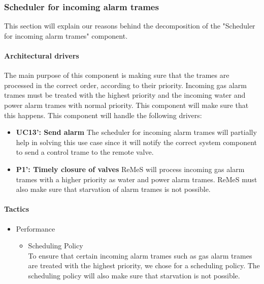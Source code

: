 \subsubsection{Scheduler for incoming alarm trames}
This section will explain our reasons behind the decomposition of 
the "Scheduler for incoming alarm trames" component.
\paragraph{Architectural drivers}
The main purpose of this component is making sure that the trames are
processed in the correct order, according to their priority. Incoming
gas alarm trames must be treated with the highest priority and the
incoming water and power alarm trames with normal priority. This component will make sure
that this happens. This component will handle the following drivers:
\begin{itemize}
	\item \textbf{UC13': Send alarm}
	The scheduler for incoming alarm trames will partially help in solving
		this use case since it will notify the correct system component to
		send a control trame to the remote valve.
	\item \textbf{P1': Timely closure of valves}
	ReMeS will process incoming gas alarm trames with a higher priority as
		water and power alarm trames. ReMeS must also make sure that starvation of
		alarm trames is not possible.
\end{itemize}
\paragraph{Tactics}
\begin{itemize}
	 \item{Performance}
	 \begin{itemize}
		\item{Scheduling Policy} \\
		To ensure that certain incoming alarm trames such as gas alarm trames
			are treated with the highest priority, we chose for a scheduling
			policy. The scheduling policy will also make sure that starvation
			is not possible.
	 \end{itemize}
\end{itemize}


